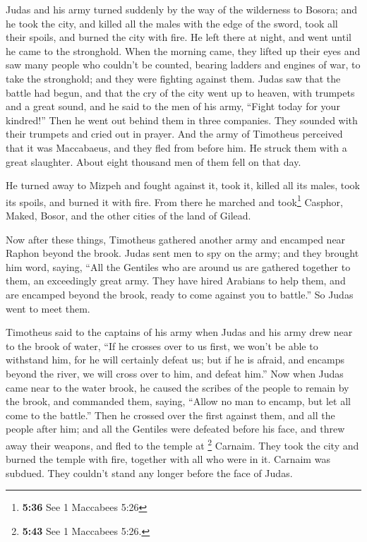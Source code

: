  Judas and his army turned suddenly by the way of the
wilderness to Bosora; and he took the city, and killed all the males
with the edge of the sword, took all their spoils, and burned the city
with fire.  He left there at night, and went until he
came to the stronghold.  When the morning came, they
lifted up their eyes and saw many people who couldn't be counted,
bearing ladders and engines of war, to take the stronghold; and they
were fighting against them.  Judas saw that the battle
had begun, and that the cry of the city went up to heaven, with trumpets
and a great sound,  and he said to the men of his army,
``Fight today for your kindred!''  Then he went out
behind them in three companies. They sounded with their trumpets and
cried out in prayer.  And the army of Timotheus perceived
that it was Maccabaeus, and they fled from before him. He struck them
with a great slaughter. About eight thousand men of them fell on that
day.

 He turned away to Mizpeh and fought against it, took it,
killed all its males, took its spoils, and burned it with fire.
 From there he marched and took\footnote{\textbf{5:36}
  See 1 Maccabees 5:26} Casphor, Maked, Bosor, and the other cities of
the land of Gilead.

 Now after these things, Timotheus gathered another army
and encamped near Raphon beyond the brook.  Judas sent
men to spy on the army; and they brought him word, saying, ``All the
Gentiles who are around us are gathered together to them, an exceedingly
great army.  They have hired Arabians to help them, and
are encamped beyond the brook, ready to come against you to battle.'' So
Judas went to meet them.

 Timotheus said to the captains of his army when Judas
and his army drew near to the brook of water, ``If he crosses over to us
first, we won't be able to withstand him, for he will certainly defeat
us;  but if he is afraid, and encamps beyond the river,
we will cross over to him, and defeat him.''  Now when
Judas came near to the water brook, he caused the scribes of the people
to remain by the brook, and commanded them, saying, ``Allow no man to
encamp, but let all come to the battle.''  Then he
crossed over the first against them, and all the people after him; and
all the Gentiles were defeated before his face, and threw away their
weapons, and fled to the temple at \footnote{\textbf{5:43} See 1
  Maccabees 5:26.} Carnaim.  They took the city and
burned the temple with fire, together with all who were in it. Carnaim
was subdued. They couldn't stand any longer before the face of Judas.


